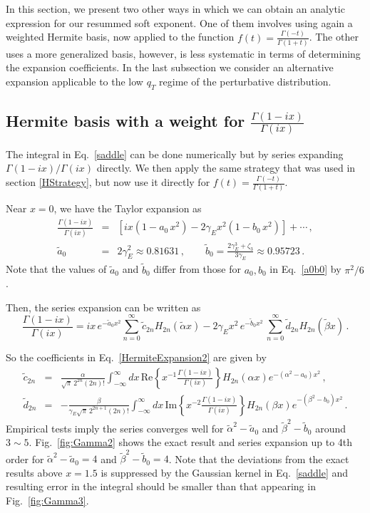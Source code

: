 \documentclass[a4,letterpaper,11pt]{article}
\newcommand{\nn}{\nonumber}
\newcommand{\be}{\begin{equation}}
\newcommand{\ee}{\end{equation}}
\newcommand{\bea}{\begin{eqnarray}}
\newcommand{\eea}{\end{eqnarray}}
\newcommand{\eq}[1]{Eq.~\eqref{#1}}
\newcommand{\fig}[1]{Fig.~\ref{fig:#1}}
\begin{document}
In this section, we present two other ways in which we can obtain an analytic expression for our resummed soft exponent. One of them involves using again a weighted Hermite basis, now applied to the function $f(t)=\frac{\Gamma(-t) }{\Gamma(1+t)}$. The other uses a more generalized basis, however, is less systematic in terms of determining the expansion coefficients. In the last subsection we consider an alternative expansion applicable to the low $q_T$ regime of the perturbative distribution.

\subsection{Hermite basis with a weight for $\frac{\Gamma(1-ix) }{\Gamma(ix)}$}
The integral in \eq{saddle} can be done numerically but by series expanding $\Gamma(1-ix )/\Gamma(ix)$  directly. We then apply the same strategy that was used in section \ref{HStrategy}, but now use it directly for $f(t)=\frac{\Gamma(-t) }{\Gamma(1+t)}$.

Near $x=0$, we have the Taylor expansion as
\bea \label{Gexpansion2}
\frac{\Gamma(1-ix) }{\Gamma(ix)} &=& \left[i x(1 - a_0\, x^2)- 2\gamma_E  x^2(1-b_0\, x^2) \right]+\cdots
\,,\\ \nn
\tilde a_0&=&2\gamma_E^2\approx 0.81631
\,, \qquad \tilde b_0 = \frac{2\gamma_E^3+\zeta_3}{3\gamma_E} \approx 0.95723
\,.\eea
Note that the values of $\tilde a_0$ and $\tilde b_0$ differ from those for $a_0,b_0$ in \eq{a0b0} by $\pi^2/6$.

Then, the series expansion can be written as
\be
\label{HermiteExpansion2}
\frac{\Gamma(1-ix) }{\Gamma(ix)}   = i x  \,  e^{-\tilde a_0 x^2} \sum_{n=0}^\infty {\tilde c}_{2n} H_{2n}(\tilde\alpha x)
	-2 \gamma_E x^2 \, e^{-\tilde b_0 x^2}\, \sum_{n=0}^\infty {\tilde d}_{2n} H_{2n}(\tilde\beta x)\,.
\ee

So the coefficients in \eq{HermiteExpansion2} are given by
\bea
\label{HermiteCoefficients2}
{\tilde c}_{2n} &=& \frac{\alpha}{\sqrt{\pi}\, 2^{2n} (2n)!} \int_{-\infty}^\infty dx \, \text{Re}\left\{x^{-1}\frac{\Gamma(1-ix)}{\Gamma(ix)}\right\} H_{2n}(\alpha x) e^{-(\alpha^2-a_0) x^2}\,,
\\ \nn
{\tilde d}_{2n} &=& -\frac{\beta}{\gamma_E \sqrt{\pi}\, 2^{2n+1} (2n)!} 
\int_{-\infty}^\infty dx \, \text{Im}\left\{x^{-2}\frac{\Gamma(1-ix)}{\Gamma(ix)} \right\} H_{2n}(\beta x) e^{-(\beta^2-b_0) x^2}\,.
\eea
Empirical tests imply the series converges well for $\tilde\alpha^2-\tilde a_0$ and $\tilde\beta^2-\tilde b_0$ around $3\sim 5$. 
\fig{Gamma2} shows the exact result and series expansion up to 4th order for $\tilde\alpha^2-\tilde a_0=4$ and $\tilde\beta^2-\tilde b_0=4$.
Note that the deviations from the exact results above $x=1.5$ is suppressed by the Gaussian kernel in \eq{saddle} and resulting error in the integral should be smaller than that appearing in \fig{Gamma3}.
   
\end{document}
